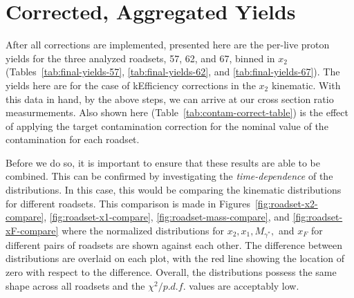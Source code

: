\section{Corrected, Aggregated Yields}

After all corrections are implemented, presented here are the per-live proton yields for the three analyzed roadsets, 57, 62, and 67, binned in $x_2$ (Tables~\ref{tab:final-yields-57}, \ref{tab:final-yields-62}, and \ref{tab:final-yields-67}).  The yields here are for the case of kEfficiency corrections in the $x_2$ kinematic. With this data in hand, by the above steps, we can arrive at our cross section ratio measurmements. Also shown here (Table~\ref{tab:contam-correct-table}) is the effect of applying the target contamination correction for the nominal value of the contamination for each roadset.

Before we do so, it is important to ensure that these results are able to be combined. This can be confirmed by investigating the \emph{time-dependence} of the distributions. In this case, this would be comparing the kinematic distributions for different roadsets. This comparison is made in Figures~\ref{fig:roadset-x2-compare}, \ref{fig:roadset-x1-compare}, \ref{fig:roadset-mass-compare}, and \ref{fig:roadset-xF-compare} where the normalized distributions for $x_2, x_1, M_{\gamma^*},$ and $x_F$ for different pairs of roadsets are shown against each other. The difference between distributions are overlaid on each plot, with the red line showing the location of zero with respect to the difference. Overall, the distributions possess the same shape across all roadsets and the $\chi^2/p.d.f.$ values are acceptably low. 

